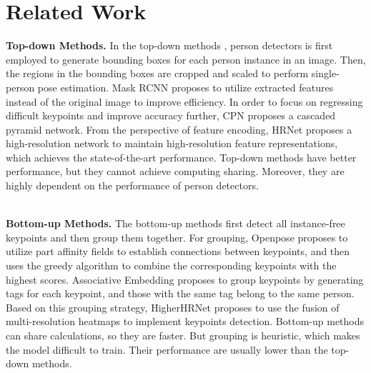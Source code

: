 \documentclass[11pt,twocolumn,journal]{IEEEtran}
\begin{document}
%
 
\section{Related Work}
\noindent \textbf{Top-down Methods.} \quad In the top-down methods \cite{chen2018cascaded, gkioxari2014using, fang2017rmpe, rogez2019lcr, newell2016stacked, chen2018cascaded, sun2019deep}, person detectors is first employed to generate bounding boxes for each person instance in an image. Then, the regions in the bounding boxes are cropped and scaled to perform single-person pose estimation. Mask RCNN \cite{he2017mask} proposes to utilize extracted features instead of the original image to improve efficiency. In order to focus on regressing difficult keypoints and improve accuracy further, CPN \cite{chen2018cascaded} proposes a cascaded pyramid network. From the perspective of feature encoding, HRNet \cite{sun2019deep} proposes a high-resolution network to maintain high-resolution feature representations, which achieves the state-of-the-art performance. Top-down methods have better performance, but they cannot achieve computing sharing. Moreover, they are highly dependent on the performance of person detectors.


\hspace*{\fill} \\
\noindent \textbf{Bottom-up Methods.} \quad The bottom-up methods \cite{cao2017realtime, insafutdinov2016deepercut, newell2017associative, higherhrnet2020} first detect all instance-free keypoints and then group them together. For grouping, Openpose \cite{cao2017realtime} proposes to utilize part affinity fields to establish connections between keypoints, and then uses the greedy algorithm to combine the corresponding keypoints with the highest scores. Associative Embedding \cite{newell2017associative} proposes to group keypoints by generating tags for each keypoint, and those with the same tag belong to the same person. Based on this grouping strategy, HigherHRNet \cite{higherhrnet2020} proposes to use the fusion of multi-resolution heatmaps to implement keypoints detection. Bottom-up methods can share calculations, so they are faster. But grouping is heuristic, which makes the model difficult to train. Their performance are usually lower than the top-down methods.
\end{document}
